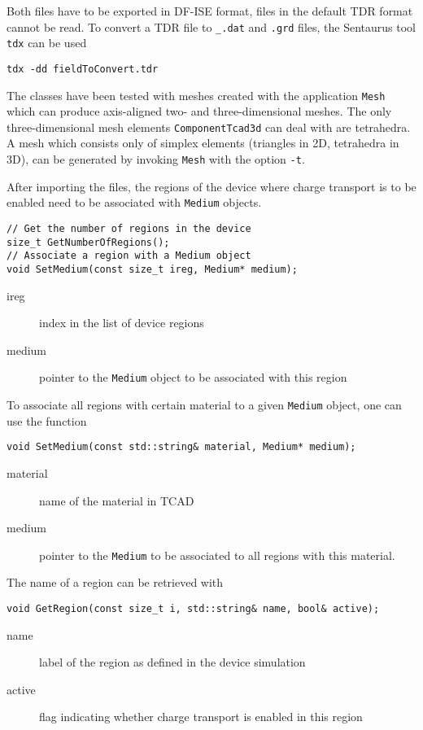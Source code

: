 Both files have to be exported in DF-ISE format, 
files in the default TDR format cannot be read.
To convert a TDR file to \texttt{\_.dat} and \texttt{.grd} files, the
Sentaurus tool \texttt{tdx} can be used
\begin{lstlisting}
tdx -dd fieldToConvert.tdr
\end{lstlisting}

The classes have been tested with meshes created with the application 
\texttt{Mesh} which can produce axis-aligned 
two- and three-dimensional meshes.
The only three-dimensional mesh elements \texttt{ComponentTcad3d} 
can deal with are tetrahedra. 
A mesh which consists only of simplex elements 
(triangles in 2D, tetrahedra in 3D), 
can be generated by invoking \texttt{Mesh} with the option \texttt{-t}.

After importing the files, 
the regions of the device where charge transport is to be enabled 
need to be associated with \texttt{Medium} objects. 
\begin{lstlisting}
// Get the number of regions in the device
size_t GetNumberOfRegions();
// Associate a region with a Medium object 
void SetMedium(const size_t ireg, Medium* medium);
\end{lstlisting}
\begin{description}
  \item[ireg]
  index in the list of device regions
  \item[medium]
  pointer to the \texttt{Medium} object to be associated with this region
\end{description}
To associate all regions with certain material to a given \texttt{Medium} 
object, one can use the function
\begin{lstlisting}
void SetMedium(const std::string& material, Medium* medium);
\end{lstlisting}
\begin{description}
  \item[material] name of the material in TCAD
  \item[medium] pointer to the \texttt{Medium} to be associated to all regions with this material.
\end{description}

The name of a region can be retrieved with
\begin{lstlisting}
void GetRegion(const size_t i, std::string& name, bool& active);
\end{lstlisting}
\begin{description}
  \item[name] 
  label of the region as defined in the device simulation
  \item[active] 
  flag indicating whether charge transport is enabled 
  in this region
\end{description}

